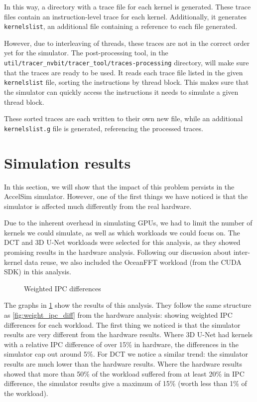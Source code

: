 In this way, a directory with a trace file for each kernel is generated.
These trace files contain an instruction-level trace for each kernel.
Additionally, it generates \verb|kernelslist|, an additional file containing a reference to each file generated.

However, due to interleaving of threads, these traces are not in the correct order yet for the simulator.
The post-processing tool, in the \verb|util/tracer_nvbit/tracer_tool/traces-processing| directory, will make sure that the traces are ready to be used.
It reads each trace file listed in the given \verb|kernelslist| file, sorting the instructions by thread block.
This makes sure that the simulator can quickly access the instructions it needs to simulate a given thread block.

These sorted traces are each written to their own new file, while an additional \verb|kernelslist.g| file is generated, referencing the processed traces.

\FloatBarrier
\section{Simulation results}\label{sec:simulation-results}
In this section, we will show that the impact of this problem persists in the AccelSim simulator.
However, one of the first things we have noticed is that the simulator is affected much differently from the real hardware.

Due to the inherent overhead in simulating GPUs, we had to limit the number of kernels we could simulate, as well as which workloads we could focus on.
The DCT and 3D U-Net workloads were selected for this analysis, as they showed promising results in the hardware analysis.
Following our discussion about inter-kernel data reuse, we also included the OceanFFT workload (from the CUDA SDK) in this analysis.

\begin{figure}[ht]
    \centering
    \caption{Weighted IPC differences}
    \label{fig:sim_ipc_diff}
\end{figure}

The graphs in \cref{fig:sim_ipc_diff} show the results of this analysis.
They follow the same structure as \cref{fig:weight_ipc_diff} from the hardware analysis: showing weighted IPC differences for each workload.
The first thing we noticed is that the simulator results are very different from the hardware results.
Where 3D U-Net had kernels with a relative IPC difference of over 15\% in hardware, the differences in the simulator cap out around 5\%.
For DCT we notice a similar trend: the simulator results are much lower than the hardware results.
Where the hardware results showed that more than 50\% of the workload suffered from at least 20\% in IPC difference, the simulator results give a maximum of 15\% (worth less than 1\% of the workload).

